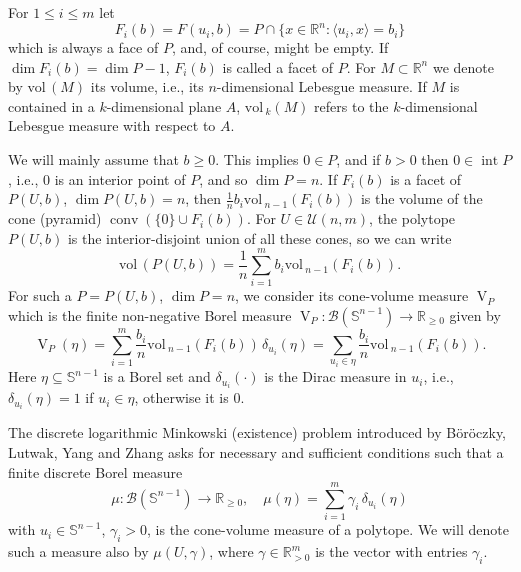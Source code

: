 \documentclass[11pt, a4paper, twoside, reqno]{amsart}
\DeclareMathOperator*{\conv}{conv}
\DeclareMathOperator*{\inter}{int}
\newcommand{\R}{\mathbb{R}}
\theoremstyle{definition}
\theoremstyle{remark}
\newcommand{\vol}{\mathrm{vol}\,}
\newcommand{\sph}{\mathbb{S}}%
\DeclareMathOperator{\V}{V}
\numberwithin{equation}{section}
\begin{document}
    For $1\leq i\leq m$ let
\begin{equation*} 
  F_i(b)=F(u_i,b)=P\cap\{x\in\R^n : \langle u_i,x\rangle =b_i\}
\end{equation*}
  which is always a face of $P$, and, of course, might be empty. If $\dim F_i(b)=\dim P-1$, $F_i(b)$ is called a facet of $P$. For $M\subset \R^n$ we denote by $\vol(M)$ its volume, i.e., its $n$-dimensional Lebesgue measure. If $M$ is contained in a
$k$-dimensional plane $A$, $\vol_k(M)$ refers to the $k$-dimensional Lebesgue measure with respect to $A$. 



We will mainly assume that $b\geq 0$. This implies $0\in P$, and if $b > 0$ then  $0 \in \inter P$, i.e., $0$ is an interior point of $P$, and so $\dim P=n$.   
If  $F_i(b)$ is a facet of $P(U,b)$, $\dim P(U,b)=n$, 
then $\frac{1}{n}b_i\vol_{n-1}(F_i(b))$ is the volume of the cone (pyramid)
$\conv(\{0\}\cup F_i(b))$. For $U\in\mathcal{U}(n,m)$, the polytope $P(U,b)$ is the interior-disjoint union of all these cones, so we can write
\begin{equation*}
            \vol(P(U,b))=\frac{1}{n}\sum_{i=1}^m b_i\vol_{n-1}(F_i(b)).
          \end{equation*}
For such a $P=P(U,b)$, $\dim P=n$, we consider its cone-volume measure $\V_P$ which is  
the finite non-negative Borel measure $\V_P:\mathcal{B}(\sph^{n-1})\to\R_{\geq 0}$          
 given by
\begin{equation*}
  \V_P(\eta) =\sum_{i=1}^m \frac{b_i}{n}\vol_{n-1}(F_i(b))\,\delta_{u_i}(\eta) =\sum_{u_i\in\eta} \frac{b_i}{n}\vol_{n-1}(F_i(b)). 
\end{equation*}
Here $\eta\subseteq \sph^{n-1}$ is a Borel set and  $\delta_{u_i}(\cdot)$ is the Dirac measure in $u_i$, i.e., $\delta_{u_i}(\eta)=1$ if $u_i\in\eta$, otherwise it is $0$.  

The discrete logarithmic Minkowski (existence) problem introduced by Böröczky, Lutwak, Yang and Zhang \cite{BoeroeczkyLutwakYangEtAl2025} asks for necessary and sufficient conditions such that a finite discrete Borel measure  
\begin{equation}
  \mu:\mathcal{B}(\sph^{n-1})\to\R_{\geq 0}, \quad \mu(\eta)=\sum_{i=1}^m \gamma_i\,\delta_{u_i}(\eta)
\label{eq:measure}  
\end{equation}
with $u_i\in\sph^{n-1}$, $\gamma_i> 0$, is the cone-volume measure of a polytope.  We will denote such a measure also by  $\mu(U,\gamma)$, where $\gamma\in\R^m_{>0}$ is the vector with entries $\gamma_i$.
\end{document}
